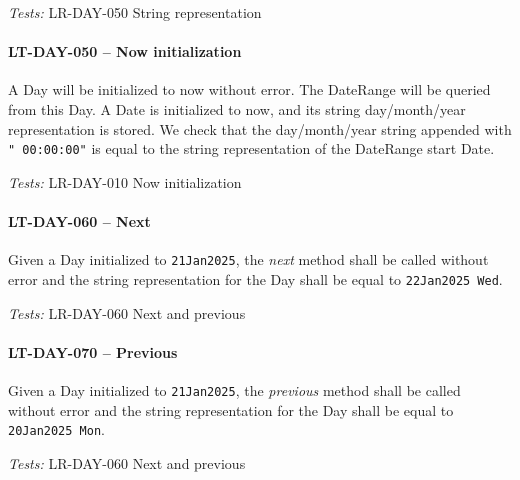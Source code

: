 \textit{Tests: } LR-DAY-050 String representation

\paragraph{LT-DAY-050 -- Now initialization}
A Day will be initialized to now without error. The DateRange will be queried
from this Day.
A Date is initialized to now, and its string day/month/year representation
is stored.
We check that the day/month/year string appended with \lstinline{" 00:00:00"} is
equal to the string representation of the DateRange start Date.

\textit{Tests: } LR-DAY-010 Now initialization

\paragraph{LT-DAY-060 -- Next}
Given a Day initialized to \lstinline{21Jan2025}, the \emph{next} method
shall be called without error and the string representation for the Day
shall be equal to \lstinline{22Jan2025 Wed}.

\textit{Tests: } LR-DAY-060 Next and previous

\paragraph{LT-DAY-070 -- Previous}
Given a Day initialized to \lstinline{21Jan2025}, the \emph{previous} method
shall be called without error and the string representation for the Day
shall be equal to \lstinline{20Jan2025 Mon}.

\textit{Tests: } LR-DAY-060 Next and previous
